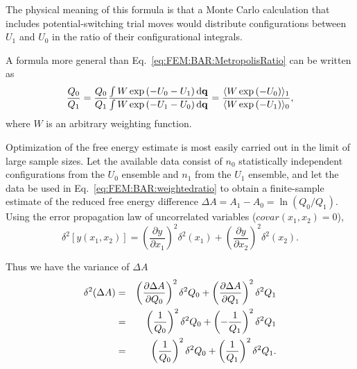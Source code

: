 The physical meaning of this formula is that a Monte Carlo calculation
that includes potential-switching trial moves would distribute configurations
between $U_{1}$ and $U_{0}$ in the ratio of their configurational
integrals. 

A formula more general than Eq.~\ref{eq:FEM:BAR:MetropolisRatio} can be written
as
\begin{equation}
	\frac{Q_{0}}{Q_{1}}=\frac{Q_{0}}{Q_{1}}\frac{\int W\exp{(-U_{0}-U_{1})}\mathop{}\!\mathrm{d}\mathbf{{q}}}{\int W\exp{(-U_{1}-U_{0})}\mathop{}\!\mathrm{d}\mathbf{{q}}}=\frac{\langle W\exp{(-U_{0})}\rangle_{1}}{\langle W\exp{(-U_{1})}\rangle_{0}},\label{eq:FEM:BAR:weightedratio}
\end{equation}
where $W$ is an arbitrary weighting function.

Optimization of the free energy estimate is most easily carried out in the limit of large sample sizes. Let the available data consist
of $n_{0}$ statistically independent configurations from the $U_{0}$ ensemble and $n_{1}$ from the $U_{1}$ ensemble, and let the data
be used in Eq.~\ref{eq:FEM:BAR:weightedratio} to obtain a finite-sample estimate of the reduced free energy difference $\Delta A=A_{1}-A_{0}=\ln{(Q_{0}/Q_{1})}$.
Using the error propagation law of uncorrelated variables ($covar(x_1,x_2)=0$),\cite{BerendsenBook2011}
\begin{equation}
	\delta^2\left[y(x_{1},x_{2})\right]=\left(\frac{\partial y}{\partial x_{1}}\right)^{2}\delta^2(x_{1})+\left(\frac{\partial y}{\partial x_{2}}\right)^{2}\delta^2(x_{2}).
\end{equation}

Thus we have the variance of $\Delta A$
\begin{eqnarray}
	\delta^2(\Delta A) & = & \left(\frac{\partial\Delta A}{\partial Q_{0}}\right)^{2}\delta^2Q_0+\left(\frac{\partial\Delta A}{\partial Q_{1}}\right)^{2}\delta^2Q_1\notag\\
	& = & \left(\frac{1}{Q_{0}}\right)^{2}\delta^2Q_0+\left(-\frac{1}{Q_{1}}\right)^{2}\delta^2Q_1\notag\\
	& = & \left(\frac{1}{Q_{0}}\right)^{2}\delta^2Q_0+\left(\frac{1}{Q_{1}}\right)^{2}\delta^2Q_1.
\end{eqnarray}

